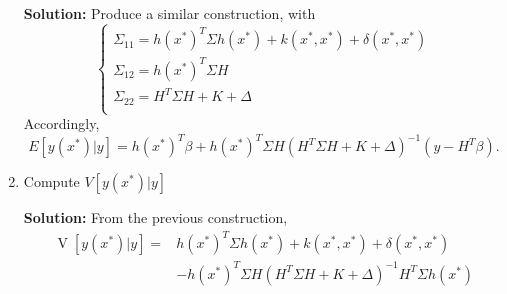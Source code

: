 \documentclass{article}[12pt]
\begin{document}
\begin{enumerate}
	\textbf{Solution: }Produce a similar construction, with
	\begin{equation}
		\begin{cases}
			\Sigma_{11} = h(x^*)^T \Sigma h(x^*) + k(x^*, x^*) + \delta(x^*, x^*) \\
			\Sigma_{12} = h(x^*)^T \Sigma H \\
			\Sigma_{22} = H^T \Sigma H + K + \Delta \\
		\end{cases}
	\end{equation}
	Accordingly, 
	\begin{equation}
		E \left[ y(x^*) | y \right] = h(x^*)^T \beta + h(x^*)^T \Sigma H \left( H^T \Sigma H + K + \Delta \right)^{-1} \left( y - H^T \beta \right).
	\end{equation}
	

\item Compute $V[y(x^*)|y]$

	\textbf{Solution: }From the previous construction,
\begin{equation}
	\begin{aligned}
		\operatorname{V} \left[ y(x^*) | y  \right] =&  h(x^*)^T \Sigma h(x^*) + k(x^*, x^*) + \delta(x^*, x^*)\\ &
		- h(x^*)^T \Sigma H  \left( H^T \Sigma H + K + \Delta \right)^{-1} H^T \Sigma h(x^*)
	\end{aligned}
\end{equation}

\end{enumerate}
\end{document}
